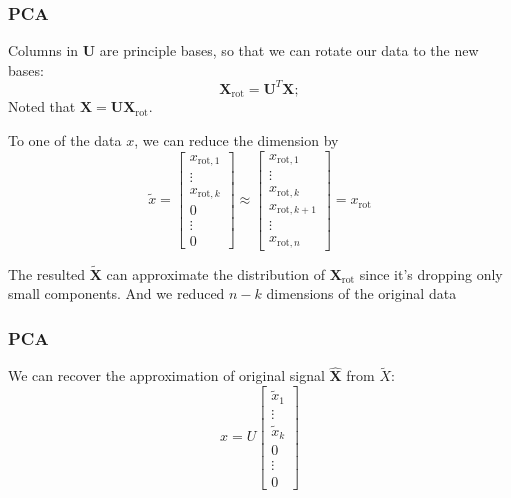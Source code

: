 \documentclass{beamer}
\begin{document}
\begin{frame}
  \frametitle{PCA}

  Columns in $\bm{U}$ are principle bases, so that we can rotate our data to the new bases:
  \begin{equation*}
    \bm{X}_{\text{rot}}=\bm{U}^{T}\bm{X};
  \end{equation*}
  Noted that $\bm{X}=\bm{U}\bm{X}_{\text{rot}}$.

  To one of the data $x$, we can reduce the dimension by
  \begin{equation*}
    \tilde{x}=\left[\begin{matrix}
        x_{\text{rot}, 1} \\ \vdots \\ x_{\text{rot}, k} \\ 0 \\ \vdots \\ 0
      \end{matrix}\right]\approx \left[\begin{matrix}
        x_{\text{rot}, 1} \\ \vdots \\ x_{\text{rot}, k} \\ x_{\text{rot},k+1} \\ \vdots \\ x_{\text{rot}, n}
      \end{matrix}\right]=x_{\text{rot}}
  \end{equation*}
  
  The resulted $\tilde{\bm{X}}$ can approximate the distribution of $\bm{X}_{\text{rot}}$ since it's dropping only small components. And we reduced $n-k$ dimensions of the original data
\end{frame}

\begin{frame}
  \frametitle{PCA}

  We can recover the approximation of original signal $\hat{\bm{X}}$ from $\tilde{X}$:
  \begin{equation*}
    \hat{x}=U\left[\begin{matrix}
        \tilde{x}_{1} \\ \vdots \\ \tilde{x}_{k} \\ 0 \\ \vdots \\ 0
      \end{matrix}\right]
  \end{equation*}
\end{frame}
\end{document}
